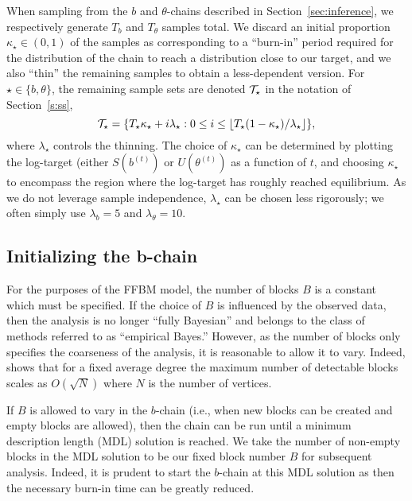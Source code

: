 When sampling from the $b$ and $\theta$-chains described
in Section~\ref{sec:inference}, we respectively generate
$T_b$ and $T_\theta$ samples total.
We discard an initial proportion $\kappa_\star\in(0,1)$ of the samples 
as corresponding to a ``burn-in'' period required for the distribution 
of the chain to reach a distribution close to our target,
and we also ``thin'' the remaining samples to 
obtain a less-dependent version. For $\star\in\{b,\theta\}$,
the remaining sample sets are denoted $\mathcal{T}_\star$
in the notation of Section~\ref{s:ss},
%
\begin{equation}
	\mathcal{T}_\star = \{T_\star \kappa_\star + i \lambda_\star :  
	0 \leq i \leq \lfloor T_\star(1 - \kappa_\star) / \lambda_\star \rfloor \},
\end{equation}
%
where $\lambda_\star$ controls the thinning. The choice of
$\kappa_\star$ can be determined by plotting the log-target (either $S(b^{(t)})$ 
or $U(\theta^{(t)})$ as a function of $t$,
and choosing $\kappa_\star$ to encompass the region where the log-target has 
roughly reached equilibrium. As we do not leverage sample independence,
$\lambda_\star$ can be chosen less rigorously; we often simply
use $\lambda_b=5$ and $\lambda_\theta = 10$.

\subsection{Initializing the b-chain}

For the purposes of the FFBM model, the number of blocks $B$ is a constant 
which must be specified. If the choice of $B$ is influenced 
by the observed data, then the analysis is no longer ``fully Bayesian''
and belongs to the class of methods referred to as ``empirical Bayes.''
However, as the number of blocks only specifies the coarseness of the 
analysis, it is reasonable to allow it to vary. Indeed, 
\citet{peixoto-determine-B} shows that for a fixed 
average degree the maximum number of detectable blocks scales 
as $O(\sqrt{N})$ where $N$ is the number of vertices.

If $B$ is allowed to vary in the $b$-chain (i.e.,
when new blocks can be created and empty blocks are allowed),
then the chain can be run until a minimum description 
length (MDL) solution is reached. We take the number of non-empty blocks 
in the MDL solution to be our fixed block number $B$ for subsequent analysis. 
Indeed, it is prudent to start the $b$-chain at this MDL solution as then 
the necessary burn-in time can be greatly reduced.

